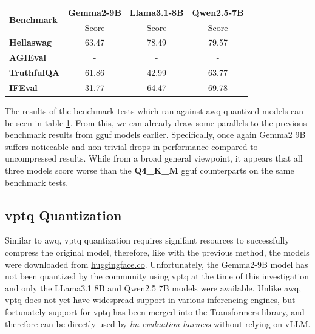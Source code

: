 \documentclass{ifacconf}
\begin{document}
    \begin{table}[H]
        \centering
        \begin{tabular}{|l|c|c|c|}
            \hline
            \multirow{2}{*}{\textbf{Benchmark}} & \textbf{Gemma2-9B} & \textbf{Llama3.1-8B} & \textbf{Qwen2.5-7B} \\ \cline{2-4}
                                                & Score    & Score      & Score      \\ \hline
            \textbf{Hellaswag}                & 63.47            & 78.49              & 79.57              \\ \hline
            \textbf{AGIEval}                  & -            & -              & -              \\ \hline
            \textbf{TruthfulQA}               & 61.86            & 42.99              & 63.77              \\ \hline
            \textbf{IFEval}                   & 31.77            & 64.47              & 69.78              \\ \hline
        \end{tabular}
        \label{tab:awq_results}
    \end{table}

    The results of the benchmark tests which ran against \gls{awq} quantized models can be seen in table \ref{tab:awq_results}. From this, we can already draw some parallels to the previous benchmark results from \gls{gguf} models earlier. Specifically, once again Gemma2 9B suffers noticeable and non trivial drops in performance compared to uncompressed results. While from a broad general viewpoint, it appears that all three models score worse than the \textbf{Q4\_K\_M} \gls{gguf} counterparts on the same benchmark tests.

    \subsection{\gls{vptq} Quantization}
    Similar to \gls{awq}, \gls{vptq} quantization requires signifant resources to successfully compress the original model, therefore, like with the previous method, the models were downloaded from \url{huggingface.co}. Unfortunately, the Gemma2-9B model has not been quantized by the community using \gls{vptq} at the time of this investigation and only the LLama3.1 8B and Qwen2.5 7B models were available. Unlike \gls{awq}, \gls{vptq} does not yet have widespread support in various inferencing engines, but fortunately support for \gls{vptq} has been merged into the Transformers library, and therefore can be directly used by \textit{lm-evaluation-harness} without relying on vLLM.
\end{document}
